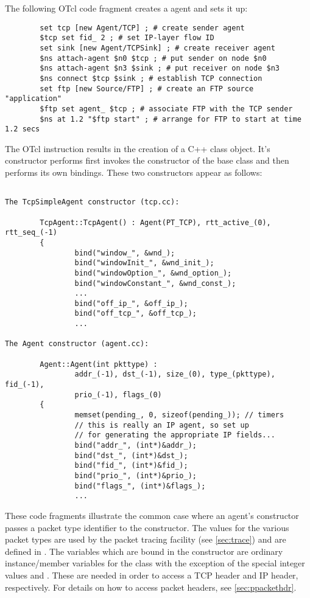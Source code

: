 The following OTcl code fragment creates a  agent
and sets it up:
\begin{small}
\begin{verbatim}
        set tcp [new Agent/TCP] ; # create sender agent
        $tcp set fid_ 2 ; # set IP-layer flow ID
        set sink [new Agent/TCPSink] ; # create receiver agent
        $ns attach-agent $n0 $tcp ; # put sender on node $n0
        $ns attach-agent $n3 $sink ; # put receiver on node $n3
        $ns connect $tcp $sink ; # establish TCP connection
        set ftp [new Source/FTP] ; # create an FTP source "application"
        $ftp set agent_ $tcp ; # associate FTP with the TCP sender
        $ns at 1.2 "$ftp start" ; # arrange for FTP to start at time 1.2 secs
\end{verbatim}
\end{small}
The OTcl instruction  results in the
creation of a C++  class object.
It's constructor performs first invokes the constructor of the
 base class and then performs its own bindings.
These two constructors appear as follows:
\begin{small}
\begin{verbatim}

The TcpSimpleAgent constructor (tcp.cc):

        TcpAgent::TcpAgent() : Agent(PT_TCP), rtt_active_(0), rtt_seq_(-1)
        {
                bind("window_", &wnd_);
                bind("windowInit_", &wnd_init_);
                bind("windowOption_", &wnd_option_);
                bind("windowConstant_", &wnd_const_);
                ...
                bind("off_ip_", &off_ip_);
                bind("off_tcp_", &off_tcp_);
                ...

The Agent constructor (agent.cc):

        Agent::Agent(int pkttype) : 
                addr_(-1), dst_(-1), size_(0), type_(pkttype), fid_(-1),
                prio_(-1), flags_(0)
        {
                memset(pending_, 0, sizeof(pending_)); // timers
                // this is really an IP agent, so set up
                // for generating the appropriate IP fields...
                bind("addr_", (int*)&addr_);
                bind("dst_", (int*)&dst_);
                bind("fid_", (int*)&fid_);
                bind("prio_", (int*)&prio_);
                bind("flags_", (int*)&flags_);
                ...
\end{verbatim}
\end{small}
These code fragments illustrate the common case where an agent's
constructor passes a packet type identifier to the 
constructor.
The values for the various packet types are used by the packet tracing
facility (see \ref{sec:trace}) and are defined in .
The variables which are bound in the  constructor
are ordinary instance/member variables for the class
with the exception of the special integer values 
and .
These are needed in order to access a TCP header and IP header,
respectively.
For details on how to access packet headers, see \ref{sec:ppackethdr}.

